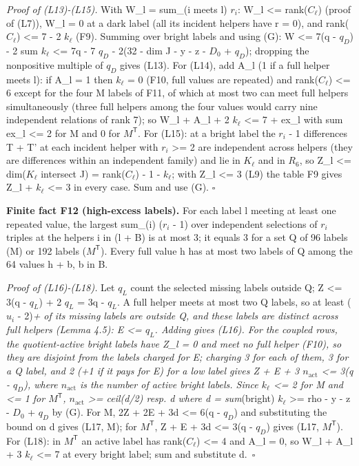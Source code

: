 \emph{Proof of (L13)-(L15).} With W\_l = sum\_(i meets l) \(r_i\): W\_l \textless= rank(\(C_\ell\)) (proof of (L7)), W\_l = 0 at a dark label (all its incident helpers have r = 0), and rank(\(C_\ell\)) \textless= 7 - 2 \(k_\ell\) (F9). Summing over bright labels and using (G): W \textless= 7(q - \(q_D\)) - 2 sum \(k_\ell\) \textless= 7q - 7 \(q_D\) - 2(32 - dim J - y - z - \(D_0\) + \(q_D\)); dropping the nonpositive multiple of \(q_D\) gives (L13). For (L14), add A\_l (1 if a full helper meets l): if A\_l = 1 then \(k_\ell\) = 0 (F10, full values are repeated) and rank(\(C_\ell\)) \textless= 6 except for the four M labels of F11, of which at most two can meet full helpers simultaneously (three full helpers among the four values would carry nine independent relations of rank 7); so W\_l + A\_l + 2 \(k_\ell\) \textless= 7 + ex\_l with sum ex\_l \textless= 2 for M and 0 for \(M^{\mathsf T}\). For (L15): at a bright label the \(r_i\) - 1 differences T + T' at each incident helper with \(r_i\) \textgreater= 2 are independent across helpers (they are differences within an independent family) and lie in \(K_\ell\) and in \(R_6\), so Z\_l \textless= dim(\(K_\ell\) intersect J) = rank(\(C_\ell\)) - 1 - \(k_\ell\); with Z\_l \textless= 3 (L9) the table F9 gives Z\_l + \(k_\ell\) \textless= 3 in every case. Sum and use (G). \(\square\)

\textbf{Finite fact F12 (high-excess labels).} For each label l meeting at least one repeated value, the largest sum\_(i) (\(r_i\) - 1) over independent selections of \(r_i\) triples at the helpers i in (l + B) is at most 3; it equals 3 for a set Q of 96 labels (M) or 192 labels (\(M^{\mathsf T}\)). Every full value h has at most two labels of Q among the 64 values h + b, b in B.

\emph{Proof of (L16)-(L18).} Let \(q_L\) count the selected missing labels outside Q; Z \textless= 3(q - \(q_L\)) + 2 \(q_L\) = 3q - \(q_L\). A full helper meets at most two Q labels, so at least (\(u_i\) - 2)\emph{+ of its missing labels are outside Q, and these labels are distinct across full helpers (Lemma 4.5): E \textless= \(q_L\). Adding gives (L16). For the coupled rows, the quotient-active bright labels have Z\_l = 0 and meet no full helper (F10), so they are disjoint from the labels charged for E; charging 3 for each of them, 3 for a Q label, and 2 (+1 if it pays for E) for a low label gives Z + E + 3 \(n_{\mathrm{act}}\) \textless= 3(q - \(q_D\)), where \(n_{\mathrm{act}}\) is the number of active bright labels. Since \(k_\ell\) \textless= 2 for M and \textless= 1 for \(M^{\mathsf T}\), \(n_{\mathrm{act}}\) \textgreater= ceil(d/2) resp. d where d = sum}(bright) \(k_\ell\) \textgreater= rho - y - z - \(D_0\) + \(q_D\) by (G). For M, 2Z + 2E + 3d \textless= 6(q - \(q_D\)) and substituting the bound on d gives (L17, M); for \(M^{\mathsf T}\), Z + E + 3d \textless= 3(q - \(q_D\)) gives (L17, \(M^{\mathsf T}\)). For (L18): in \(M^{\mathsf T}\) an active label has rank(\(C_\ell\)) \textless= 4 and A\_l = 0, so W\_l + A\_l + 3 \(k_\ell\) \textless= 7 at every bright label; sum and substitute d.~\(\square\)


